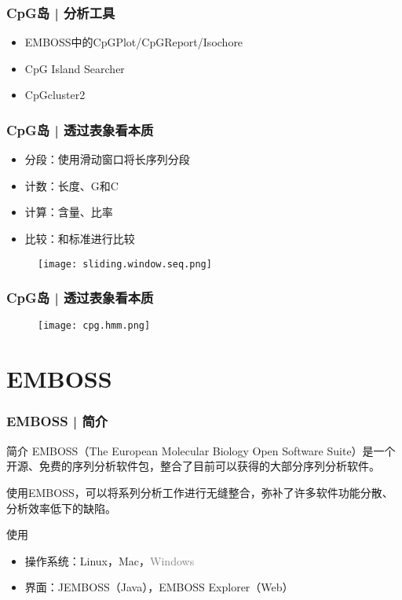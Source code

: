 \begin{frame}
  \frametitle{CpG岛 | 分析工具}
  \begin{itemize}
    \item EMBOSS中的CpGPlot/CpGReport/Isochore
    \item CpG Island Searcher
    \item CpGcluster2
  \end{itemize}
\end{frame}

\begin{frame}
  \frametitle{CpG岛 | 透过表象看本质}
  \begin{itemize}
    \item 分段：使用滑动窗口将长序列分段
    \item 计数：长度、G和C
    \item 计算：含量、比率
    \item 比较：和标准进行比较
  \end{itemize}
  \begin{figure}
    \centering
    \texttt{[image: sliding.window.seq.png]}
  \end{figure}
\end{frame}

\begin{frame}
  \frametitle{CpG岛 | 透过表象看本质}
  \begin{figure}
    \centering
    \texttt{[image: cpg.hmm.png]}
  \end{figure}
\end{frame}

\section{EMBOSS}
\begin{frame}
  \frametitle{EMBOSS | 简介}
  \begin{block}{简介}
    EMBOSS（The European Molecular Biology Open Software Suite）是一个开源、免费的序列分析软件包，整合了目前可以获得的大部分序列分析软件。

    使用EMBOSS，可以将系列分析工作进行无缝整合，弥补了许多软件功能分散、分析效率低下的缺陷。
  \end{block}
  \begin{block}{使用}
    \begin{itemize}
      \item 操作系统：Linux，Mac，\textcolor{gray}{Windows}
      \item 界面：JEMBOSS（Java），EMBOSS Explorer（Web）
    \end{itemize}
  \end{block}
\end{frame}

